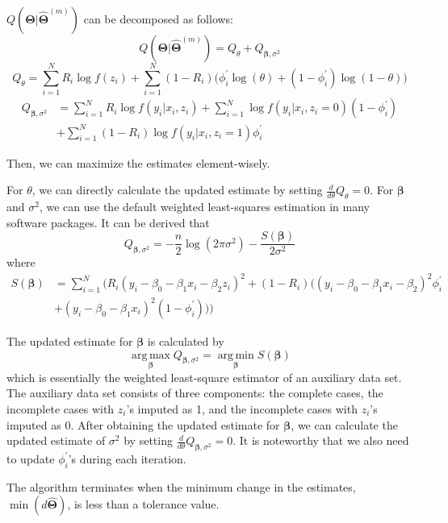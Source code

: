 \documentclass[
  12pt,
]{article}
\begin{document}
\(Q(\boldsymbol{\Theta} | \hat{\boldsymbol{\Theta}}^{(m)})\) can be
decomposed as follows: \[
Q(\boldsymbol{\Theta} | \hat{\boldsymbol{\Theta}}^{(m)}) = Q_{\theta} + Q_{\boldsymbol\beta, \sigma^2}
\] \[
Q_{\theta} = \sum_{i=1}^{N} R_i \log f(z_i) + \sum_{i=1}^{N} (1 - R_i) \big( \phi_i^{\prime} \log(\theta) + (1 - \phi_i^{\prime}) \log(1 - \theta) \big)
\] \[
\begin{aligned}
Q_{\boldsymbol\beta, \sigma^2} &= \sum_{i=1}^{N} R_i \log f(y_i|x_i, z_i) + \sum_{i=1}^{N} \log f(y_i|x_i, z_i = 0)(1 - \phi_i^{\prime}) \\
&+ \sum_{i=1}^{N}(1 - R_i) \log f(y_i|x_i, z_i = 1)\phi_i^{\prime}
\end{aligned}
\]

Then, we can maximize the estimates element-wisely.

For \(\theta\), we can directly calculate the updated estimate by
setting \(\frac{d}{d\theta}Q_{\theta} = 0\). For \(\boldsymbol\beta\)
and \(\sigma^2\), we can use the default weighted least-squares
estimation in many software packages. It can be derived that \[
Q_{\boldsymbol\beta, \sigma^2} = - \frac{n}{2} \log(2\pi\sigma^2) - \frac{S(\boldsymbol\beta)}{2\sigma^2}
\] where \[
\begin{aligned}
S(\boldsymbol\beta) &= \sum_{i = 1}^{N} \Big(
R_i(y_i - \beta_0 - \beta_1 x_i - \beta_2 z_i)^2 + (1 - R_i)\big(
    (y_i - \beta_0 - \beta_1 x_i - \beta_2)^2 \phi_i^{\prime} \\
    &+ (y_i - \beta_0 - \beta_1 x_i)^2 (1 - \phi_i^{\prime})
  \big)
\Big)
\end{aligned}
\]

The updated estimate for \(\boldsymbol\beta\) is calculated by \[
\operatorname*{arg\,max}_{\boldsymbol\beta} Q_{\boldsymbol\beta, \sigma^2} = \operatorname*{arg\,min}_{\boldsymbol\beta} S(\boldsymbol\beta)
\] which is essentially the weighted least-square estimator of an
auxiliary data set. The auxiliary data set consists of three components:
the complete cases, the incomplete cases with \(z_i\)'s imputed as 1,
and the incomplete cases with \(z_i\)'s imputed as 0. After obtaining
the updated estimate for \(\boldsymbol\beta\), we can calculate the
updated estimate of \(\sigma^2\) by setting
\(\frac{d}{d\theta}Q_{\boldsymbol\beta, \sigma^2} = 0\). It is
noteworthy that we also need to update \(\phi_i^{\prime}\)'s during each
iteration.

The algorithm terminates when the minimum change in the estimates,
\(\min(d \hat{\boldsymbol{\Theta}})\), is less than a tolerance value.
\end{document}
